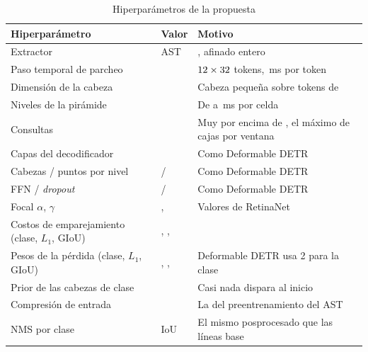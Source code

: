 \begin{table}[htbp]
    \centering
    \small
    \begin{threeparttable}
        \caption{Hiperparámetros de la propuesta}
        \label{tab:hiperparametros}
        \begin{tabular}{@{}L{4.4cm}L{2.6cm}L{6.4cm}@{}}
            \toprule
            \textbf{Hiperparámetro} & \textbf{Valor} & \textbf{Motivo} \\
            \midrule
            Extractor & AST & \mAstCheckpoint{}, afinado entero \\
            Paso temporal de parcheo & \mTimeStride{} & $12 \times 32$ tokens, \mTokenMs{}\,ms por token \\
            Dimensión de la cabeza & \mDim{} & Cabeza pequeña sobre tokens de \mHidden{} \\
            Niveles de la pirámide & \mLevels{} & De \mCellZero{} a \mCellThree{}\,ms por celda \\
            Consultas & \mQueries{} & Muy por encima de \maxPerWindow{}, el máximo de cajas por ventana \\
            Capas del decodificador & \mDecoderLayers{} & Como Deformable DETR \\
            Cabezas / puntos por nivel & \mHeads{} / \mPoints{} & Como Deformable DETR \\
            FFN / \textit{dropout} & \mFfn{} / \mDropout{} & Como Deformable DETR \\
            Focal $\alpha$, $\gamma$ & \mFocalAlpha{}, \mFocalGamma{} & Valores de RetinaNet \\
            Costos de emparejamiento (clase, $L_1$, GIoU) & \mCostClass{}, \mCostBbox{}, \mCostIou{} & \citet{zhu_deformable_2021} \\
            Pesos de la pérdida (clase, $L_1$, GIoU) & \mWeightClass{}, \mCostBbox{}, \mCostIou{} & Deformable DETR usa 2 para la clase \\
            Prior de las cabezas de clase & \mPrior{} & Casi nada dispara al inicio \\
            Compresión de entrada & \mFrontend{} & La del preentrenamiento del AST \\
            NMS por clase & IoU \mNmsIou{} & El mismo posprocesado que las líneas base \\
            \bottomrule
        \end{tabular}
    \end{threeparttable}
\end{table}

